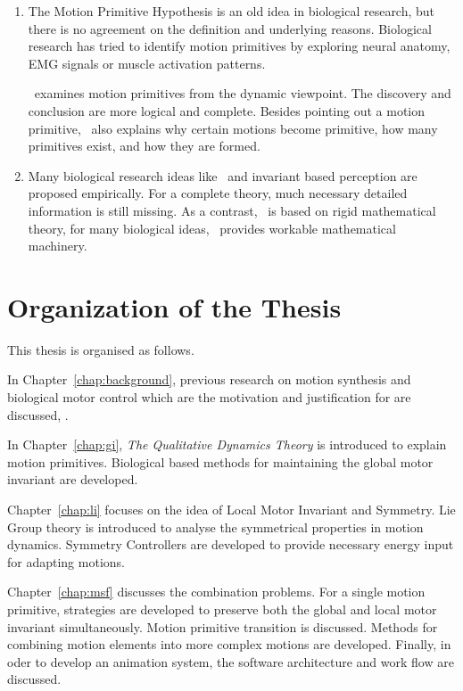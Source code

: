 \begin{enumerate}
\item 
The Motion Primitive Hypothesis is an old idea in biological research, but there is no agreement on the definition and underlying reasons.
Biological research has tried to identify motion primitives by exploring neural anatomy, EMG signals or muscle activation patterns.

{\moit}\ examines motion primitives from the dynamic viewpoint.
The discovery and conclusion are more logical and complete.
Besides pointing out a motion primitive, {\moit}\ also explains why certain motions become primitive, how many primitives exist, and how they are formed.


\item Many biological research ideas like \cpg\ and invariant based perception are proposed empirically. 
For a complete theory, much necessary detailed information is still missing.
As a contrast, {\moit}\ is based on rigid mathematical theory, for many biological ideas, {\moit}\ provides workable mathematical machinery.

\end{enumerate}







\section{Organization of the Thesis}

This thesis is organised as follows.
 
In Chapter~\ref{chap:background}, previous research on motion synthesis and biological motor control which are the motivation and justification for {\moit} are discussed, .
 
In Chapter~\ref{chap:gi},  \emph{The Qualitative Dynamics Theory} is introduced to explain motion primitives. 
Biological based  methods for maintaining the global motor invariant are developed.

Chapter~\ref{chap:li} focuses on the idea of Local Motor Invariant and Symmetry.
Lie Group theory is  introduced  to analyse the symmetrical properties in motion dynamics.
Symmetry Controllers are developed to provide necessary energy input for adapting motions.
 


Chapter~\ref{chap:msf} discusses the combination problems.
For a single motion primitive,  strategies are developed to preserve both the global and local motor invariant simultaneously.
Motion primitive transition is discussed.
Methods for combining motion elements into more complex motions are developed.
Finally, in oder to develop an animation system, the software architecture and work flow are discussed.

